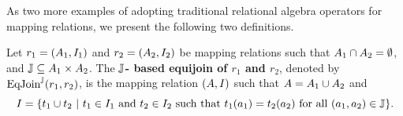 
As two more examples of adopting traditional relational algebra operators for mapping relations, we present the following two definitions.

\begin{definition}
	\label{def:equijoin_operator}
	\normalfont
	Let $r_{1} = (A_{1}, I_{1})$ and
	$r_{2} = (A_{2}, I_{2})$ be mapping relations
	such that $A_{1} \cap A_{2} = \emptyset$,
	and
	$\mathbb{J} \subseteq A_{1} \times A_{2}$.
	The \textbf{$\mathbb{J}$-%
		based
	equijoin of $r_{1}$ and $r_{2}$},
	denoted by $\text{EqJoin}^{\mathbb{J}}(r_{1}, r_{2})$, is the mapping relation
	$(A, I)$
	such that $A = A_{1} \cup A_{2}$
	and%
%
\vspace{-2mm} %
%
	\begin{equation*}
		I =  \{ t_1 \cup t_2 \ | \
		t_1 \in I_{1} \text { and }
		t_2 \in I_{2} \text{ such that }
		t_1(a_1) = t_2(a_2) \text{ for all }
		(a_1,a_2) \in \mathbb{J}
		\}
		.
	\end{equation*}
\end{definition}





